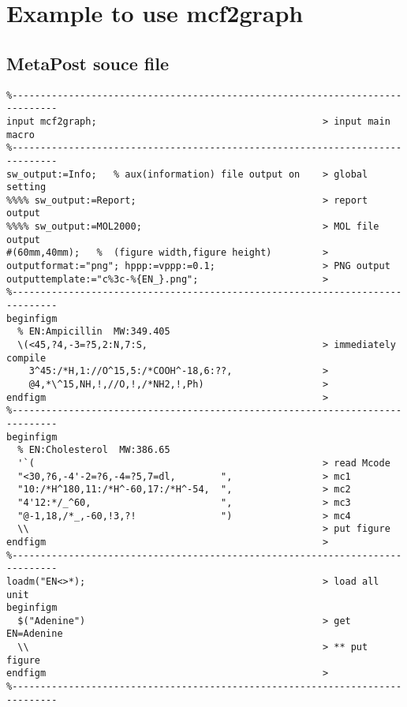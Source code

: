 \documentclass[a4paper]{article}
\begin{document}
\section{Example to use mcf2graph}
\subsection{MetaPost souce file}
%
%
\index{\textbackslash()}%
%
%
%
%
\begin{verbatim}
%------------------------------------------------------------------------------
input mcf2graph;                                        > input main macro
%------------------------------------------------------------------------------
sw_output:=Info;   % aux(information) file output on    > global setting
%%%% sw_output:=Report;                                 > report output
%%%% sw_output:=MOL2000;                                > MOL file output
#(60mm,40mm);   %  (figure width,figure height)         >
outputformat:="png"; hppp:=vppp:=0.1;                   > PNG output
outputtemplate:="c%3c-%{EN_}.png";                      >
%------------------------------------------------------------------------------
beginfigm
  % EN:Ampicillin  MW:349.405
  \(<45,?4,-3=?5,2:N,7:S,                               > immediately compile
    3^45:/*H,1://O^15,5:/*COOH^-18,6:??,                >
    @4,*\^15,NH,!,//O,!,/*NH2,!,Ph)                     >
endfigm                                                 >
%------------------------------------------------------------------------------
beginfigm
  % EN:Cholesterol  MW:386.65
  '`(                                                   > read Mcode
  "<30,?6,-4'-2=?6,-4=?5,7=dl,        ",                > mc1
  "10:/*H^180,11:/*H^-60,17:/*H^-54,  ",                > mc2
  "4'12:*/_^60,                       ",                > mc3
  "@-1,18,/*_,-60,!3,?!               ")                > mc4
  \\                                                    > put figure
endfigm                                                 >
%------------------------------------------------------------------------------
loadm("EN<>*);                                          > load all unit
beginfigm
  $("Adenine")                                          > get EN=Adenine
  \\                                                    > ** put figure
endfigm                                                 >
%------------------------------------------------------------------------------

\end{verbatim}
\end{document}
